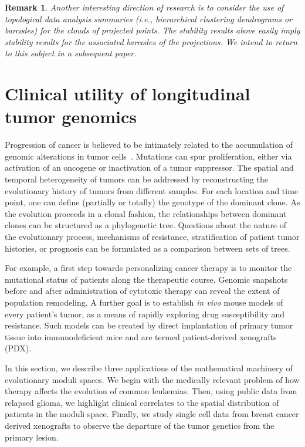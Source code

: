 \documentclass[a4paper,11pt]{article}
\newtheorem{remark}[theorem]{Remark}
\begin{document}
\begin{remark}
Another interesting direction of research is to consider the use of topological data analysis summaries (i.e., hierarchical clustering dendrograms or barcodes) for the clouds of projected points.
The stability results above easily imply stability results for the associated barcodes of the projections.
We intend to return to this subject in a subsequent paper.
\end{remark}

\section{Clinical utility of longitudinal tumor genomics}\label{sec:cancer}

Progression of cancer is believed to be intimately related to the accumulation of genomic alterations in tumor cells~\cite{nowell1976clonal}.
Mutations can spur proliferation, either via activation of an oncogene or inactivation of a tumor suppressor.
The spatial and temporal heterogeneity of tumors can be addressed by reconstructing the evolutionary history of tumors from different samples.
For each location and time point, one can define (partially or totally) the genotype of the dominant clone.
As the evolution proceeds in a clonal fashion, the relationships between dominant clones can be structured as a phylogenetic tree.
Questions about the nature of the evolutionary process, mechanisms of resistance, stratification of patient tumor histories, or prognosis can be formulated as a comparison between sets of trees.

For example, a first step towards personalizing cancer therapy is to monitor the mutational status of patients along the therapeutic course.
Genomic snapshots before and after administration of cytotoxic therapy can reveal the extent of population remodeling.
A further goal is to establish \textit{in vivo} mouse models of every patient's tumor, as a means of rapidly exploring drug susceptibility and resistance.
Such models can be created by direct implantation of primary tumor tissue into immunodeficient mice and are termed patient-derived xenografts (PDX).

In this section, we describe three applications of the mathematical machinery of evolutionary moduli spaces.
We begin with the medically relevant problem of how therapy affects the evolution of common leukemias.
Then, using public data from relapsed glioma, we highlight clinical correlates to the spatial distribution of patients in the moduli space.
Finally, we study single cell data from breast cancer derived xenografts to observe the departure of the tumor genetics from the primary lesion.
\end{document}
